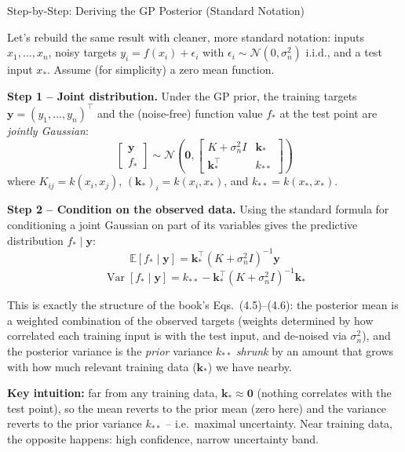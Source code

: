 \documentclass[aspectratio=169,10pt]{beamer}
\begin{document}
\begin{frame}[allowframebreaks]{Step-by-Step: Deriving the GP Posterior (Standard Notation)}

Let's rebuild the same result with cleaner, more standard notation:
inputs $x_1,\ldots,x_n$, noisy targets $y_i = f(x_i) + \epsilon_i$ with
$\epsilon_i \sim \mathcal{N}(0,\sigma_n^2)$ i.i.d., and a test input
$x_*$. Assume (for simplicity) a zero mean function.

\textbf{Step 1 -- Joint distribution.} Under the GP prior, the training
targets $\mathbf{y}=(y_1,\ldots,y_n)^\top$ and the (noise-free) function
value $f_*$ at the test point are \emph{jointly Gaussian}:
\[
  \begin{bmatrix} \mathbf{y} \\ f_* \end{bmatrix}
  \sim \mathcal{N}\!\left(\mathbf{0},
  \begin{bmatrix} K + \sigma_n^2 I & \mathbf{k}_* \\
                  \mathbf{k}_*^\top & k_{**} \end{bmatrix}\right)
\]
where $K_{ij}=k(x_i,x_j)$, $(\mathbf{k}_*)_i = k(x_i,x_*)$, and
$k_{**}=k(x_*,x_*)$.

\framebreak

\textbf{Step 2 -- Condition on the observed data.} Using the standard
formula for conditioning a joint Gaussian on part of its variables gives
the predictive distribution $f_* \mid \mathbf{y}$:
\[
  \mathbb{E}[f_*\mid\mathbf{y}] = \mathbf{k}_*^\top (K+\sigma_n^2 I)^{-1}\mathbf{y}
\]
\[
  \operatorname{Var}[f_*\mid\mathbf{y}] = k_{**} -
   \mathbf{k}_*^\top (K+\sigma_n^2 I)^{-1}\mathbf{k}_*
\]

This is exactly the structure of the book's Eqs.\ (4.5)--(4.6): the
posterior mean is a weighted combination of the observed targets (weights
determined by how correlated each training input is with the test
input, and de-noised via $\sigma_n^2$), and the posterior variance is the
\emph{prior} variance $k_{**}$ \emph{shrunk} by an amount that grows with
how much relevant training data ($\mathbf{k}_*$) we have nearby.

\textbf{Key intuition:} far from any training data, $\mathbf{k}_*\approx
\mathbf{0}$ (nothing correlates with the test point), so the mean reverts
to the prior mean (zero here) and the variance reverts to the prior
variance $k_{**}$ -- i.e.\ maximal uncertainty. Near training data, the
opposite happens: high confidence, narrow uncertainty band.

\end{frame}
\end{document}
